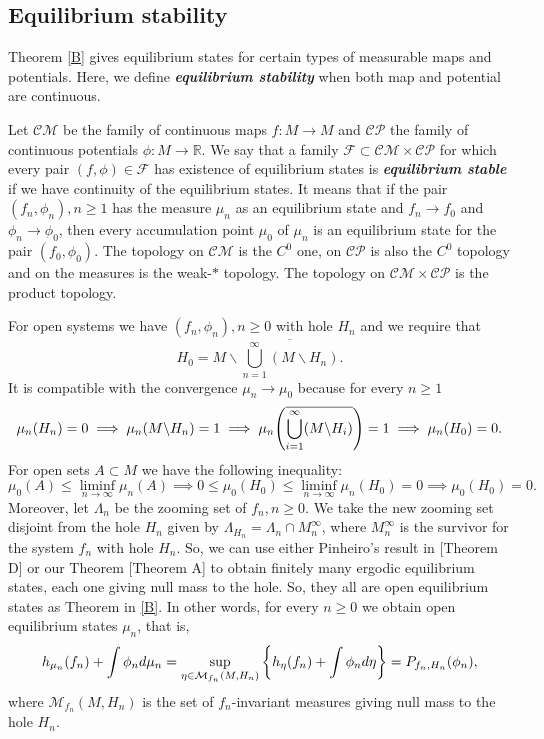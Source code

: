 \documentclass[12pt,a4paper]{amsart}
\theoremstyle{plain}
\begin{document}
\subsection{Equilibrium stability} Theorem \ref{B} gives equilibrium states for certain types of measurable maps and potentials. Here, we define \textbf{\textit{equilibrium stability}} when both map and potential are continuous.

Let $\mathcal{CM}$ be the family of continuous maps $f: M \to M$ and $\mathcal{CP}$ the family of continuous potentials $\phi : M \to \mathbb{R}$. We say that a family $\mathcal{F} \subset \mathcal{CM} \times \mathcal{CP}$ for which every pair $(f,\phi) \in \mathcal{F}$ has existence of equilibrium states is  \textbf{\textit{equilibrium stable}} if we have continuity of the equilibrium states. It means that if the pair $(f_{n},\phi_{n}), n \geq 1$ has the measure $\mu_{n}$ as an equilibrium state and $f_{n} \to f_{0}$ and $\phi_{n} \to \phi_{0}$, then every accumulation point $\mu_{0}$ of $\mu_{n}$ is an equilibrium state for the pair $(f_{0},\phi_{0})$. The topology on $\mathcal{CM}$ is the $C^{0}$ one, on $\mathcal{CP}$ is also the $C^{0}$ topology and on the measures is the weak-$*$ topology. The topology on $\mathcal{CM} \times \mathcal{CP}$ is the product topology. 

For open systems we have $(f_{n}, \phi_{n}), n \geq 0$ with hole $H_{n}$ and we require that
\[
H_{0} = M\backslash \overline{\bigcup_{n=1}^{\infty} (M\backslash H_{n})}.
\] 
It is compatible with the convergence $\mu_{n} \to \mu_{0}$ because for every $n \geq 1$
\[
\mu_{n}(H_{n}) = 0 \implies \mu_{n}(M\backslash H_{n}) = 1 \implies \mu_{n}\Bigg{(} \overline{\bigcup_{i=1}^{\infty} (M\backslash H_{i})} \Bigg{)} = 1 \implies \mu_{n}(H_{0}) = 0.
\]
For open sets $A \subset M$ we have the following inequality:
\[
\mu_{0}(A) \leq  \liminf_{n \to \infty} \mu_{n}(A) \implies 0 \leq \mu_{0}(H_{0}) \leq  \liminf_{n \to \infty} \mu_{n}(H_{0}) = 0 \implies \mu_{0}(H_{0}) = 0.
\]
Moreover, let $\Lambda_{n}$ be the zooming set of $f_{n}, n 
\geq 0$. We take the new zooming set disjoint from the hole $H_{n}$ given by $\Lambda_{H_{n}}= \Lambda_{n} \cap M_{n}^{\infty}$, where $M_{n}^{\infty}$ is the survivor for the system $f_{n}$ with hole $H_{n}$. So, we can use either Pinheiro's result in \cite{Pi1}[Theorem D] or our Theorem \cite{S}[Theorem A] to obtain finitely many ergodic equilibrium states, each one giving null mass to the hole. So, they all are open equilibrium states as Theorem in \ref{B}. In other words, for every $n \geq 0$ we obtain open equilibrium states $\mu_{n}$, that is, 
\[
\displaystyle h_{\mu_{n}}(f_{n}) + \int \phi_{n} d\mu_{n} = \sup_{\eta \in \mathcal{M}_{f_{n}}(M,H_{n})} \bigg{\{} h_{\eta}(f_{n}) + \int \phi_{n} d\eta \bigg{\}} = P_{f_{n},H_{n}}(\phi_{n}),
\]
where $\mathcal{M}_{f_{n}}(M,H_{n})$ is the set of $f_{n}$-invariant measures giving null mass to the hole $H_{n}$.
\end{document}

